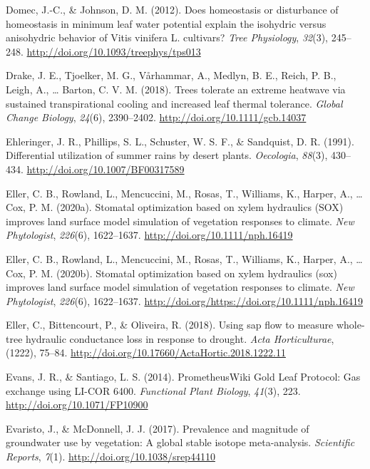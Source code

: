 \documentclass[11pt,twoside]{reedthesis}
\begin{document}
\hypertarget{ref-domec_does_2012}{}
Domec, J.-C., \& Johnson, D. M. (2012). Does homeostasis or disturbance
of homeostasis in minimum leaf water potential explain the isohydric
versus anisohydric behavior of Vitis vinifera L. cultivars? \emph{Tree
Physiology}, \emph{32}(3), 245--248.
\url{http://doi.org/10.1093/treephys/tps013}

\hypertarget{ref-drake_trees_2018}{}
Drake, J. E., Tjoelker, M. G., Vårhammar, A., Medlyn, B. E., Reich, P.
B., Leigh, A., \ldots{} Barton, C. V. M. (2018). Trees tolerate an
extreme heatwave via sustained transpirational cooling and increased
leaf thermal tolerance. \emph{Global Change Biology}, \emph{24}(6),
2390--2402. \url{http://doi.org/10.1111/gcb.14037}

\hypertarget{ref-ehleringer_differential_1991}{}
Ehleringer, J. R., Phillips, S. L., Schuster, W. S. F., \& Sandquist, D.
R. (1991). Differential utilization of summer rains by desert plants.
\emph{Oecologia}, \emph{88}(3), 430--434.
\url{http://doi.org/10.1007/BF00317589}

\hypertarget{ref-eller_stomatal_2020}{}
Eller, C. B., Rowland, L., Mencuccini, M., Rosas, T., Williams, K.,
Harper, A., \ldots{} Cox, P. M. (2020a). Stomatal optimization based on
xylem hydraulics (SOX) improves land surface model simulation of
vegetation responses to climate. \emph{New Phytologist}, \emph{226}(6),
1622--1637. \url{http://doi.org/10.1111/nph.16419}

\hypertarget{ref-Eller2020}{}
Eller, C. B., Rowland, L., Mencuccini, M., Rosas, T., Williams, K.,
Harper, A., \ldots{} Cox, P. M. (2020b). Stomatal optimization based on
xylem hydraulics (sox) improves land surface model simulation of
vegetation responses to climate. \emph{New Phytologist}, \emph{226}(6),
1622--1637. \url{http://doi.org/https://doi.org/10.1111/nph.16419}

\hypertarget{ref-eller_using_2018}{}
Eller, C., Bittencourt, P., \& Oliveira, R. (2018). Using sap flow to
measure whole-tree hydraulic conductance loss in response to drought.
\emph{Acta Horticulturae}, (1222), 75--84.
\url{http://doi.org/10.17660/ActaHortic.2018.1222.11}

\hypertarget{ref-evans_prometheuswiki_2014}{}
Evans, J. R., \& Santiago, L. S. (2014). PrometheusWiki Gold Leaf
Protocol: Gas exchange using LI-COR 6400. \emph{Functional Plant
Biology}, \emph{41}(3), 223. \url{http://doi.org/10.1071/FP10900}

\hypertarget{ref-evaristo2017}{}
Evaristo, J., \& McDonnell, J. J. (2017). Prevalence and magnitude of
groundwater use by vegetation: A global stable isotope meta-analysis.
\emph{Scientific Reports}, \emph{7}(1).
\url{http://doi.org/10.1038/srep44110}
\end{document}
